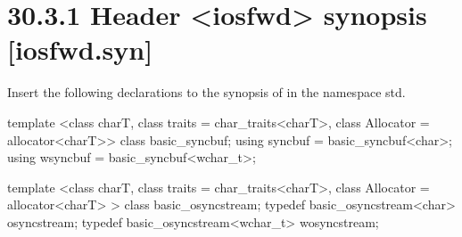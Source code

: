\documentclass[ebook,11pt,article]{memoir}
\begin{document}
\section{30.3.1 Header <iosfwd> synopsis [iosfwd.syn]}

Insert the following declarations to the synopsis of  in the namespace std.

\begin{addedblock}
\begin{codeblock}
template <class charT,
          class traits = char_traits<charT>,
          class Allocator = allocator<charT>>
  class basic_syncbuf;
using syncbuf  = basic_syncbuf<char>;
using wsyncbuf = basic_syncbuf<wchar_t>;

template <class charT,
          class traits = char_traits<charT>,
          class Allocator = allocator<charT> >
  class basic_osyncstream;
typedef basic_osyncstream<char> osyncstream;
typedef basic_osyncstream<wchar_t> wosyncstream; 
\end{codeblock}
\end{addedblock}
\end{document}
